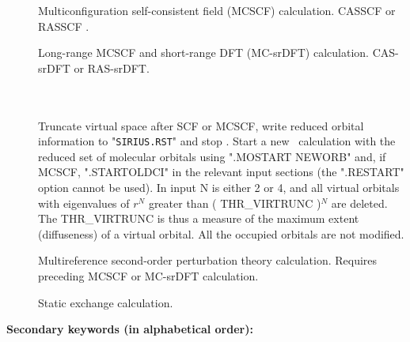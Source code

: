 \begin{description}
\begin{description}
\item[]
  Multiconfiguration self-consistent field (MCSCF) calculation. CASSCF or RASSCF .

\item[]
  Long-range MCSCF and short-range DFT (MC-srDFT) calculation. CAS-srDFT or RAS-srDFT.

\item[] \ \\
   \\
  Truncate virtual space after SCF or MCSCF, write reduced orbital information to 
  "\verb|SIRIUS.RST|" and stop \dalton. Start a new \dalton\ calculation with the
  reduced set of molecular orbitals using ".MOSTART NEWORB" and, if MCSCF, ".STARTOLDCI"
  in the relevant input sections (the ".RESTART" option cannot be used).
  In input N is either 2 or 4, and all virtual orbitals with eigenvalues of
  $r^N$ greater than ( THR\_VIRTRUNC )$^N$ are deleted.
  The THR\_VIRTRUNC is thus a measure of the maximum extent (diffuseness) of a virtual orbital.
  All the occupied orbitals are not modified.

\item[]
  Multireference second-order perturbation theory calculation.
  Requires preceding MCSCF or MC-srDFT calculation.

\item[]
  Static exchange calculation.

\end{description}

\end{description}

{\bf Secondary keywords (in alphabetical order): }

